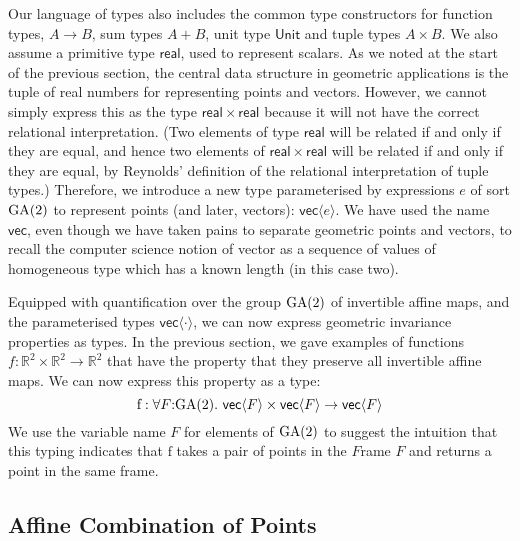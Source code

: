 Our language of types also includes the common type constructors for
function types, $A \to B$, sum types $A + B$, unit type
$\mathsf{Unit}$ and tuple types $A \times B$. We also assume a
primitive type $\mathsf{real}$, used to represent scalars. As we noted
at the start of the previous section, the central data structure in
geometric applications is the tuple of real numbers for representing
points and vectors. However, we cannot simply express this as the type
$\mathsf{real} \times \mathsf{real}$ because it will not have the
correct relational interpretation. (Two elements of type
$\mathsf{real}$ will be related if and only if they are equal, and
hence two elements of $\mathsf{real} \times \mathsf{real}$ will be
related if and only if they are equal, by Reynolds' definition of the
relational interpretation of tuple types.) Therefore, we introduce a
new type parameterised by expressions $e$ of sort $\mathrm{GA}(2)$ to
represent points (and later, vectors): $\mathsf{vec}\langle e
\rangle$. We have used the name $\mathsf{vec}$, even though we have
taken pains to separate geometric points and vectors, to recall the
computer science notion of vector as a sequence of values of
homogeneous type which has a known length (in this case two).


Equipped with quantification over the group $\mathrm{GA}(2)$ of invertible
affine maps, and the parameterised types $\mathsf{vec}\langle \cdot
\rangle$, we can now express geometric invariance properties as
types. In the previous section, we gave examples of functions $f :
\mathbb{R}^2 \times \mathbb{R}^2 \to \mathbb{R}^2$ that have the
property that they preserve all invertible affine maps. We can now
express this property as a type:
\begin{displaymath}
  \mathrm{f} : \forall F \mathord: \GA(2).\ \mathsf{vec}\langle F \rangle \times \mathsf{vec}\langle F \rangle \to \mathsf{vec}\langle F \rangle
\end{displaymath}
We use the variable name $F$ for elements of $\mathrm{GA}(2)$ to suggest the
intuition that this typing indicates that $\mathrm{f}$ takes a pair of
points in the $F$rame $F$ and returns a point in the same frame.

\subsection{Affine Combination of Points}
\label{sec:affine-combination}

